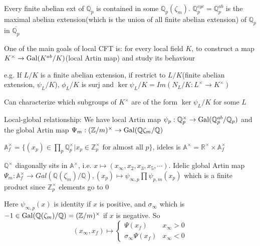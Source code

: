 \documentclass[main]{subfiles}
\begin{document}
\begin{theorem}
Every finite abelian ext of $\mathbb Q_p$ is contained in some $\mathbb Q_p(\zeta_m)$. $\mathbb Q_p^{cyc}=\mathbb Q_p^{ab}$ is the maximal abelian extension(which is the union of all finite abelian extension) of $\mathbb Q_p$ in $\overline{\mathbb Q_p}$
\end{theorem}

One of the main goals of local CFT is: for every local field $K$, to construct a map $K^\times\to \operatorname{Gal}(K^{ab}/K)$(local Artin map) and study its behaviour

e.g. If $L/K$ is a finite abelian extension, if restrict to $L/K$(finite abelian extension, $\psi_L/K$), $\phi_L/K$ is surj and $\ker\psi_L/K=Im(N_L/K:L^\times\to K^\times)$

Can characterize which subgroups of $K^\times$ are of the form $\ker\psi_L/K$ for some $L$

Local-global relationship: We have local Artin map $\psi_p:\mathbb Q_p^\times\to\operatorname{Gal}(\mathbb Q_p^{ab}/\mathbb Q_p)$ and the global Artin map $\Psi_m:(\mathbb Z/m)^\times\to\operatorname{Gal}(\mathbb Q\zeta_m/\mathbb Q)$
\begin{center}
\end{center}

\begin{definition}
$\mathbb A_f^\times=\{(x_p)\in\prod_p\mathbb Q_p^\times|x_p\in \mathbb Z_p^\times\text{ for almost all }p\}$, ideles is $\mathbb A^\times=\mathbb R^\times\times\mathbb A_f^\times$
\end{definition}

$\mathbb Q^\times$ diagonally sits in $\mathbb A^\times$, i.e. $x\mapsto(x_\infty,x_2,x_3,x_5,\cdots)$. Idelic global Artin map $\Psi_m:\mathbb A_f^\times\to Gal(\mathbb Q(\zeta_m)/\mathbb Q),(x_p)\mapsto \psi_{\infty,p}\prod\psi_{p,m}(x_p)$ which is a finite product since $\mathbb Z_p^\times$ elements go to 0

Here $\psi_{\infty,p}(x)$ is identity if $x$ is positive, and $\sigma_\infty$ which is $-1\in\operatorname{Gal}(\mathbb Q(\zeta_m)/\mathbb Q)=(\mathbb Z/m)^\times$ if $x$ is negative. So
\[(x_\infty,x_f)\mapsto\begin{cases}
\Psi(x_f)& x_\infty>0\\
\sigma_\infty\Psi(x_f)& x_\infty<0
\end{cases}\]
\end{document}
